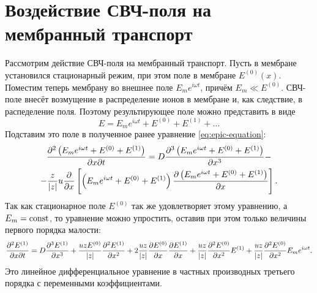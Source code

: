 \chapter{Воздействие СВЧ-поля на мембранный транспорт}

Рассмотрим действие СВЧ-поля на мембранный транспорт. Пусть в мембране
установился стационарный режим, при этом поле в мембране \( E^{(0)}(x) \).
Поместим теперь мембрану во внешнее поле \( E_m e^{i\omega t} \), причём
\( E_m \ll E^{(0)} \). СВЧ-поле внесёт возмущение в распределение ионов в мембране и, как следствие, в распеделение поля. Поэтому результирующее поле можно представить в виде
\begin{equation}
    E = E_m e^{i\omega t} + E^{(0)} + E^{(1)} + \ldots
\end{equation}
Подставим это поле в полученное ранее уравнение \eqref{eq:epic-equation}:
\begin{gather*}
    \frac{\partial^2 \left(E_m e^{i\omega t} + E^{(0)} + E^{(1)}\right)}{\partial x \partial t} =
     D\frac{\partial^3
         \left(E_m e^{i\omega t} + E^{(0)} + E^{(1)}\right)
    }{\partial x^3}
     -\\-
    \frac{z}{\left| z \right|}u\frac{\partial }{\partial x}\left[
    \left(E_m e^{i\omega t} + E^{(0)} + E^{(1)}\right)
    \frac{\partial \left(E_m e^{i\omega t} + E^{(0)} + E^{(1)}\right)}{\partial x}\right].
\end{gather*}
Так как стационарное поле \( E^{(0)} \) так же удовлетворяет этому уравнению,
а \( E_m = \mathrm{const} \), то уравнение можно упростить, оставив при этом только
величины первого порядка малости:
\begin{equation}
    \frac{\partial^2 E^{(1)}}{\partial x \partial t} = D\frac{\partial^3 E^{(1)}}{\partial x^3} +
    \frac{uzE^{(0)}}{\left| z \right|}\frac{\partial^2 E^{(1)}}{\partial {x}^2} +
    2\frac{uz}{\left| z \right|}\frac{\partial E^{(0)}}{\partial x}\frac{\partial E^{(1)}}{\partial x} +
    \frac{uz}{\left| z \right|}\frac{\partial^2 E^{(0)}}{\partial {x}^2} E^{(1)} +
    \frac{uz}{\left| z \right|}\frac{\partial^2 E^{(0)}}{\partial {x}^2} E_m e^{i\omega t}.
\end{equation}
Это линейное дифференциальное уравнение в частных производных третьего порядка с
переменными коэффициентами.
